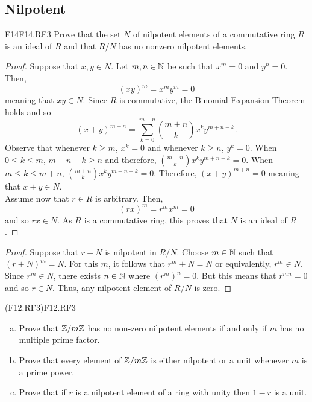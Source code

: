 \documentclass[../AlgebraQualSolutions.tex]{subfiles}
\begin{document}
\subsection{Nilpotent}

\begin{prob}{F14}{F14.RF3}
	Prove that the set $N$ of nilpotent elements of a commutative ring $R$ is an ideal of $R$ and that $R/N$ has no nonzero nilpotent elements.
\end{prob}

\begin{proof}
	Suppose that $x,y \in N$. Let $m,n \in \mathbb{N}$ be such that $x^m = 0$ and $y^n = 0$. Then,
		\[(xy)^m = x^my^m = 0 \]
	meaning that $xy \in N$. Since $R$ is commutative, the Binomial Expansion Theorem holds and so
		\[(x + y)^{m+n} = \sum_{k=0}^{m+n} {{m+n}\choose{k}}x^ky^{m+n - k}.\]
	Observe that whenever $k \geq m$, $x^k = 0$ and whenever $k \geq n$, $y^k = 0$. When $0 \leq k \leq m$, $m + n - k \geq n$ and therefore, ${{m+n}\choose{k}}x^ky^{m+n - k} = 0$. When $m \leq k \leq m+n$, ${{m+n}\choose{k}}x^ky^{m+n - k} = 0$. Therefore, $(x+y)^{m+n} = 0$ meaning that $x + y \in N$.\\

	Assume now that $r \in R$ is arbitrary. Then,
		\[(rx)^m = r^mx^m = 0\]
	and so $rx \in N$. As $R$ is a commutative ring, this proves that $N$ is an ideal of $R$.
\end{proof}

\begin{proof}
	Suppose that $r + N$ is nilpotent in $R/N$. Choose $m \in \mathbb{N}$ such that $(r + N)^m = N$. For this $m$, it follows that $r^m + N = N$ or equivalently, $r^m \in N$. Since $r^m \in N$, there exists $n \in \mathbb{N}$ where $(r^m)^n = 0$. But this means that $r^{mn} = 0$ and so $r \in N$. Thus, any nilpotent element of $R/N$ is zero.
\end{proof}

\begin{prob}{(F12.RF3)}{F12.RF3}
\begin{enumerate}[(a)]
\item Prove that $\mathbb{Z}/m\mathbb{Z}$ has no non-zero nilpotent elements if and only if $m$ has no multiple prime factor.
\item Prove that every element of $\mathbb{Z}/m\mathbb{Z}$ is either nilpotent or a unit whenever $m$ is a prime power.
\item Prove that if $r$ is a nilpotent element of a ring with unity then $1-r$ is a unit.
\end{enumerate}
\end{prob}
\end{document}
